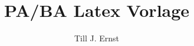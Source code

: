 %
%




\title{PA/BA Latex Vorlage}
\author{Till J. Ernst}





% 






\setcounter{page}{1}
\tableofcontents
\newpage

\listoffigures

\listoftables

%
\printglossaries

\setcounter{page}{1}
















